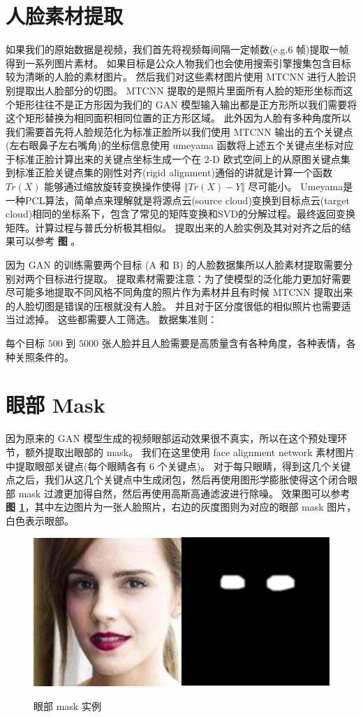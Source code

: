 \section{人脸素材提取}
如果我们的原始数据是视频，我们首先将视频每间隔一定帧数(e.g.$6$ 帧)提取一帧得到一系列图片素材。
如果目标是公众人物我们也会使用搜索引擎搜集包含目标较为清晰的人脸的素材图片。
然后我们对这些素材图片使用 MTCNN 进行人脸识别提取出人脸部分的切图。
MTCNN 提取的是照片里面所有人脸的矩形坐标而这个矩形往往不是正方形因为我们的 GAN 模型输入输出都是正方形所以我们需要将这个矩形替换为相同面积相同位置的正方形区域。
此外因为人脸有多种角度所以我们需要首先将人脸规范化为标准正脸所以我们使用 MTCNN 输出的五个关键点(左右眼鼻子左右嘴角)的坐标信息使用 umeyama 函数将上述五个关键点坐标对应于标准正脸计算出来的关键点坐标生成一个在 2-D 欧式空间上的从原图关键点集到标准正脸关键点集的刚性对齐(rigid alignment)通俗的讲就是计算一个函数 $Tr(X)$ 能够通过缩放旋转变换操作使得 $\Vert Tr(X) - Y \Vert$ 尽可能小。
Umeyama是一种PCL算法，简单点来理解就是将源点云(source cloud)变换到目标点云(target cloud)相同的坐标系下，包含了常见的矩阵变换和SVD的分解过程。最终返回变换矩阵。计算过程与普氏分析极其相似。
提取出来的人脸实例及其对对齐之后的结果可以参考 \textbf{图 }。


因为 GAN 的训练需要两个目标 (A 和 B) 的人脸数据集所以人脸素材提取需要分别对两个目标进行提取。
提取素材需要注意：为了使模型的泛化能力更加好需要尽可能多地提取不同风格不同角度的照片作为素材并且有时候 MTCNN 提取出来的人脸切图是错误的压根就没有人脸。
并且对于区分度很低的相似照片也需要适当过滤掉。
这些都需要人工筛选。
数据集准则：


每个目标 $500$ 到 $5000$ 张人脸并且人脸需要是高质量含有各种角度，各种表情，各种关照条件的。


\section{眼部 Mask}
因为原来的 GAN 模型生成的视频眼部运动效果很不真实，所以在这个预处理环节，额外提取出眼部的 mask。
我们在这里使用 face alignment network 素材图片中提取眼部关键点(每个眼睛各有 $6$ 个关键点)。
对于每只眼睛，得到这几个关键点之后，我们从这几个关键点中生成闭包，然后再使用图形学膨胀使得这个闭合眼部 mask 过渡更加得自然，然后再使用高斯高通滤波进行除噪。
效果图可以参考 \textbf{图 \ref{fig:eyes_mask}}，其中左边图片为一张人脸照片，右边的灰度图则为对应的眼部 mask 图片，白色表示眼部。

\begin{figure}[h!]
	\caption{眼部 mask 实例}
	\centering
	\includegraphics[width=\textwidth]{eyes_mask.png}
	\label{fig:eyes_mask}
\end{figure}

